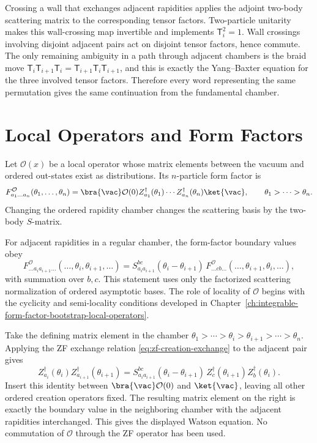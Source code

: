 Crossing a wall that exchanges adjacent rapidities applies the adjoint
two-body scattering matrix to the corresponding tensor factors.  Two-particle
unitarity makes this wall-crossing map invertible and implements
\(\mathsf T_i^2=1\).  Wall crossings involving disjoint adjacent pairs act on
disjoint tensor factors, hence commute.  The only remaining ambiguity in a
path through adjacent chambers is the braid move
\(\mathsf T_i\mathsf T_{i+1}\mathsf T_i=
\mathsf T_{i+1}\mathsf T_i\mathsf T_{i+1}\), and this is exactly the
Yang--Baxter equation for the three involved tensor factors.  Therefore every
word representing the same permutation gives the same continuation from the
fundamental chamber.

\section{Local Operators and Form Factors}

Let \(\mathcal O(x)\) be a local operator whose matrix elements between the
vacuum and ordered out-states exist as distributions.  Its \(n\)-particle form
factor is
\[
  F^{\mathcal O}_{a_1\ldots a_n}(\theta_1,\ldots,\theta_n)
  =
  \bra{\vac}\mathcal O(0)
  Z_{a_1}^\dagger(\theta_1)\cdots Z_{a_n}^\dagger(\theta_n)\ket{\vac},
  \qquad \theta_1>\cdots>\theta_n .
\]
Changing the ordered rapidity chamber changes the scattering basis by the
two-body \(S\)-matrix.

\begin{remark}
\label{rem:watson-exchange-ordered-bases}
For adjacent rapidities in a regular chamber, the form-factor boundary values
obey
\[
  F^{\mathcal O}_{\ldots a_i a_{i+1}\ldots}(\ldots,\theta_i,\theta_{i+1},\ldots)
  =
  S_{a_i a_{i+1}}^{bc}(\theta_i-\theta_{i+1})\,
  F^{\mathcal O}_{\ldots c b\ldots}(\ldots,\theta_{i+1},\theta_i,\ldots),
\]
with summation over \(b,c\).  This statement uses only the factorized
scattering normalization of ordered asymptotic bases.  The role of locality
of \(\mathcal O\) begins with the cyclicity and semi-locality conditions
developed in
Chapter~\ref{ch:integrable-form-factor-bootstrap-local-operators}.
\end{remark}

Take the defining matrix element in the chamber
\(\theta_1>\cdots>\theta_i>\theta_{i+1}>\cdots>\theta_n\).  Applying the ZF
exchange relation \eqref{eq:zf-creation-exchange} to the adjacent pair gives
\[
  Z_{a_i}^\dagger(\theta_i)Z_{a_{i+1}}^\dagger(\theta_{i+1})
  =
  S_{a_i a_{i+1}}^{bc}(\theta_i-\theta_{i+1})\,
  Z_c^\dagger(\theta_{i+1})Z_b^\dagger(\theta_i).
\]
Insert this identity between \(\bra{\vac}\mathcal O(0)\) and \(\ket{\vac}\),
leaving all other ordered creation operators fixed.  The resulting matrix
element on the right is exactly the boundary value in the neighboring chamber
with the adjacent rapidities interchanged.  This gives the displayed Watson
equation.  No commutation of \(\mathcal O\) through the ZF operator has been
used.

